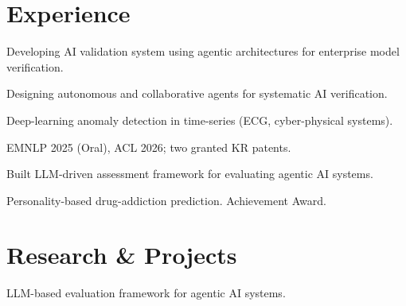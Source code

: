 \documentclass[]{deedy-resume-openfont}
\begin{document}
\begin{minipage}[t]{0.66\textwidth}

\section{Experience}

\begin{tightemize}
\item Developing AI validation system using agentic architectures for enterprise model verification.
\item Designing autonomous and collaborative agents for systematic AI verification.
\end{tightemize}
\sectionsep

\begin{tightemize}
\item Deep-learning anomaly detection in time-series (ECG, cyber-physical systems).
\item EMNLP 2025 (Oral), ACL 2026; two granted KR patents.
\end{tightemize}
\sectionsep

\begin{tightemize}
\item Built LLM-driven assessment framework for evaluating agentic AI systems.
\end{tightemize}
\sectionsep

\begin{tightemize}
\item Personality-based drug-addiction prediction. Achievement Award.
\end{tightemize}
\sectionsep

\section{Research \& Projects}

 
LLM-based evaluation framework for agentic AI systems.
\sectionsep


\end{minipage}
\end{document}

